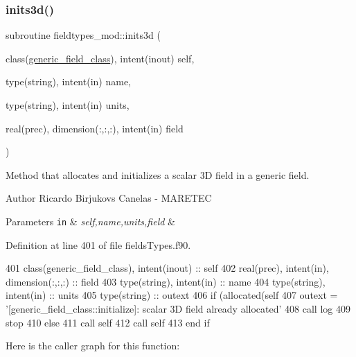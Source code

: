 \subsubsection{\texorpdfstring{inits3d()}{inits3d()}}
{\footnotesize\ttfamily subroutine fieldtypes\+\_\+mod\+::inits3d (\begin{DoxyParamCaption}\item[{class(\mbox{\hyperlink{structfieldtypes__mod_1_1generic__field__class}{generic\+\_\+field\+\_\+class}}), intent(inout)}]{self,  }\item[{type(string), intent(in)}]{name,  }\item[{type(string), intent(in)}]{units,  }\item[{real(prec), dimension(\+:,\+:,\+:), intent(in)}]{field }\end{DoxyParamCaption})\hspace{0.3cm}{\ttfamily [private]}}



Method that allocates and initializes a scalar 3D field in a generic field. 

\begin{DoxyAuthor}{Author}
Ricardo Birjukovs Canelas -\/ M\+A\+R\+E\+T\+EC 
\end{DoxyAuthor}

\begin{DoxyParams}[1]{Parameters}
\mbox{\tt in}  & {\em self,name,units,field} & \\
\hline
\end{DoxyParams}


Definition at line 401 of file fields\+Types.\+f90.


\begin{DoxyCode}
401     \textcolor{keywordtype}{class}(generic\_field\_class), \textcolor{keywordtype}{intent(inout)} :: self
402     \textcolor{keywordtype}{real(prec)}, \textcolor{keywordtype}{intent(in)}, \textcolor{keywordtype}{dimension(:,:,:)} :: field
403     \textcolor{keywordtype}{type}(string), \textcolor{keywordtype}{intent(in)} :: name
404     \textcolor{keywordtype}{type}(string), \textcolor{keywordtype}{intent(in)} :: units
405     \textcolor{keywordtype}{type}(string) :: outext
406     \textcolor{keywordflow}{if} (\textcolor{keyword}{allocated}(self%
407         outext = \textcolor{stringliteral}{'[generic\_field\_class::initialize]: scalar 3D field already allocated'}
408         \textcolor{keyword}{call }log%
409         stop
410     \textcolor{keywordflow}{else}
411         \textcolor{keyword}{call }self%
412         \textcolor{keyword}{call }self%
413 \textcolor{keywordflow}{    end if}
\end{DoxyCode}
Here is the caller graph for this function\+:
\mbox{\label{namespacefieldtypes__mod_a1987bd94293cfd9e35016ac5992501cd}} 
